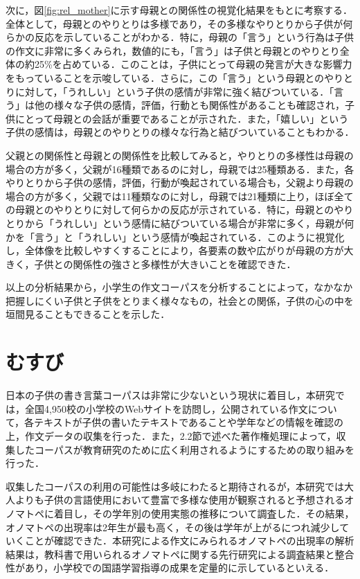 \documentclass[japanese]{jnlp_1.4}
\begin{document}
次に，図\ref{fig:rel_mother}に示す母親との関係性の視覚化結果をもとに考察する．全体として，母親とのやりとりは多様であり，その多様なやりとりから子供が何らかの反応を示していることがわかる．特に，母親の「言う」という行為は子供の作文に非常に多くみられ，数値的にも，「言う」は子供と母親とのやりとり全体の約25\%を占めている．このことは，子供にとって母親の発言が大きな影響力をもっていることを示唆している．さらに，この「言う」という母親とのやりとりに対して，「うれしい」という子供の感情が非常に強く結びついている．「言う」は他の様々な子供の感情，評価，行動とも関係性があることも確認され，子供にとって母親との会話が重要であることが示された．また，「嬉しい」という子供の感情は，母親とのやりとりの様々な行為と結びついていることもわかる． 

父親との関係性と母親との関係性を比較してみると，やりとりの多様性は母親の場合の方が多く，父親が16種類であるのに対し，母親では25種類ある．また，各やりとりから子供の感情，評価，行動が喚起されている場合も，父親より母親の場合の方が多く，父親では11種類なのに対し，母親では21種類に上り，ほぼ全ての母親とのやりとりに対して何らかの反応が示されている．特に，母親とのやりとりから「うれしい」という感情に結びついている場合が非常に多く，母親が何かを「言う」と「うれしい」という感情が喚起されている．このように視覚化し，全体像を比較しやすくすることにより，各要素の数や広がりが母親の方が大きく，子供との関係性の強さと多様性が大きいことを確認できた．

以上の分析結果から，小学生の作文コーパスを分析することによって，なかなか把握しにくい子供と子供をとりまく様々なもの，社会との関係，子供の心の中を垣間見ることもできることを示した．



\section{むすび}

日本の子供の書き言葉コーパスは非常に少ないという現状に着目し，本研究では，全国4,950校の小学校のWebサイトを訪問し，公開されている作文について，各テキストが子供の書いたテキストであることや学年などの情報を確認の上，作文データの収集を行った．また，2.2節で述べた著作権処理によって，収集したコーパスが教育研究のために広く利用されるようにするための取り組みを行った．

収集したコーパスの利用の可能性は多岐にわたると期待されるが，本研究では大人よりも子供の言語使用において豊富で多様な使用が観察されると予想されるオノマトペに着目し，その学年別の使用実態の推移について調査した．その結果，オノマトペの出現率は2年生が最も高く，その後は学年が上がるにつれ減少していくことが確認できた．本研究による作文にみられるオノマトペの出現率の解析結果は，教科書で用いられるオノマトペに関する先行研究による調査結果と整合性があり，小学校での国語学習指導の成果を定量的に示しているといえる．
\end{document}

